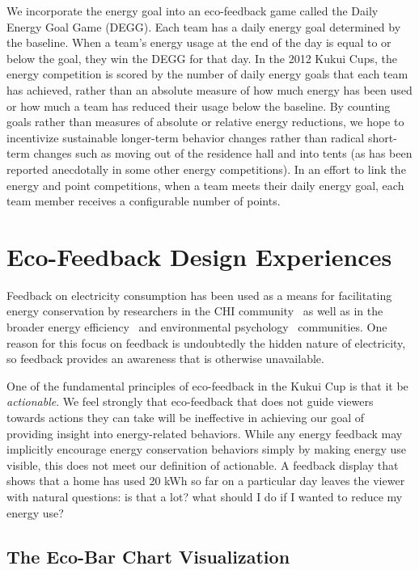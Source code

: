 \documentclass{sigchi}
\begin{document}
We incorporate the energy goal into an eco-feedback game called the Daily Energy Goal Game (DEGG). Each team has a daily energy goal determined by the baseline. When a team's energy usage at the end of the day is equal to or below the goal, they win the DEGG for that day. In the 2012 Kukui Cups, the energy competition is scored by the number of daily energy goals that each team has achieved, rather than an absolute measure of how much energy has been used or how much a team has reduced their usage below the baseline. By counting goals rather than measures of absolute or relative energy reductions, we hope to incentivize sustainable longer-term behavior changes rather than radical short-term changes such as moving out of the residence hall and into tents (as has been reported anecdotally in some other energy competitions). In an effort to link the energy and point competitions, when a team meets their daily energy goal, each team member receives a configurable number of points.


\section{Eco-Feedback Design Experiences}

Feedback on electricity consumption has been used as a means for facilitating energy conservation by researchers in the CHI community~\cite{Froehlich2010} as well as in the broader energy efficiency~\cite{darby-review-2006, Faruqui09, Foster-2012} and environmental psychology~\cite{Becker78, Houwelingen89} communities. One reason for this focus on feedback is undoubtedly the hidden nature of electricity, so feedback provides an awareness that is otherwise unavailable.

One of the fundamental principles of eco-feedback in the Kukui Cup is that it be \emph{actionable}. We feel strongly that eco-feedback that does not guide viewers towards actions they can take will be ineffective in achieving our goal of providing insight into energy-related behaviors. While any energy feedback may implicitly encourage energy conservation behaviors simply by making energy use visible, this does not meet our definition of actionable. A feedback display that shows that a home has used 20 kWh so far on a particular day leaves the viewer with natural questions: is that a lot? what should I do if I wanted to reduce my energy use?


\subsection{The Eco-Bar Chart Visualization}
\end{document}
